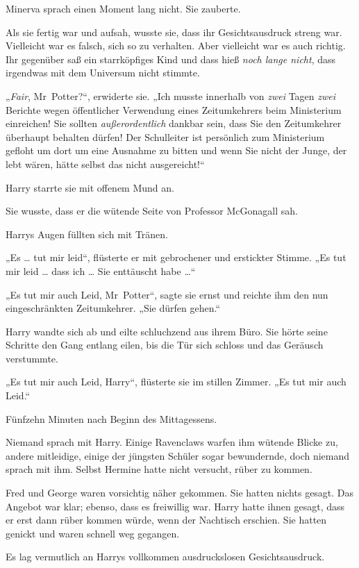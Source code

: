 {Minerva sprach einen Moment lang nicht. Sie zauberte.

Als sie fertig war und aufsah, wusste sie, dass ihr Gesichtsausdruck streng war. Vielleicht war es falsch, sich so zu verhalten. Aber vielleicht war es auch richtig. Ihr gegenüber saß ein starrköpfiges Kind und dass hieß \emph{noch lange nicht}, dass irgendwas mit dem Universum nicht stimmte.

„\emph{Fair}, Mr~Potter?“, erwiderte sie. „Ich musste innerhalb von \emph{zwei} Tagen \emph{zwei} Berichte wegen öffentlicher Verwendung eines Zeitumkehrers beim Ministerium einreichen! Sie sollten \emph{außerordentlich} dankbar sein, dass Sie den Zeitumkehrer überhaupt behalten dürfen! Der Schulleiter ist persönlich zum Ministerium gefloht um dort um eine Ausnahme zu bitten und wenn Sie nicht der Junge, der lebt wären, hätte selbst das nicht ausgereicht!“

Harry starrte sie mit offenem Mund an.

Sie wusste, dass er die wütende Seite von Professor McGonagall sah.

Harrys Augen füllten sich mit Tränen.

„Es … tut mir leid“, flüsterte er mit gebrochener und erstickter Stimme. „Es tut mir leid … dass ich … Sie enttäuscht habe …“

„Es tut mir auch Leid, Mr~Potter“, sagte sie ernst und reichte ihm den nun eingeschränkten Zeitumkehrer. „Sie dürfen gehen.“

Harry wandte sich ab und eilte schluchzend aus ihrem Büro. Sie hörte seine Schritte den Gang entlang eilen, bis die Tür sich schloss und das Geräusch verstummte.

„Es tut mir auch Leid, Harry“, flüsterte sie im stillen Zimmer. „Es tut mir auch Leid.“

\later

Fünfzehn Minuten nach Beginn des Mittagessens.

Niemand sprach mit Harry. Einige Ravenclaws warfen ihm wütende Blicke zu, andere mitleidige, einige der jüngsten Schüler sogar bewundernde, doch niemand sprach mit ihm. Selbst Hermine hatte nicht versucht, rüber zu kommen.

Fred und George waren vorsichtig näher gekommen. Sie hatten nichts gesagt. Das Angebot war klar; ebenso, dass es freiwillig war. Harry hatte ihnen gesagt, dass er erst dann rüber kommen würde, wenn der Nachtisch erschien. Sie hatten genickt und waren schnell weg gegangen.

Es lag vermutlich an Harrys vollkommen ausdruckslosen Gesichtsausdruck.

}
